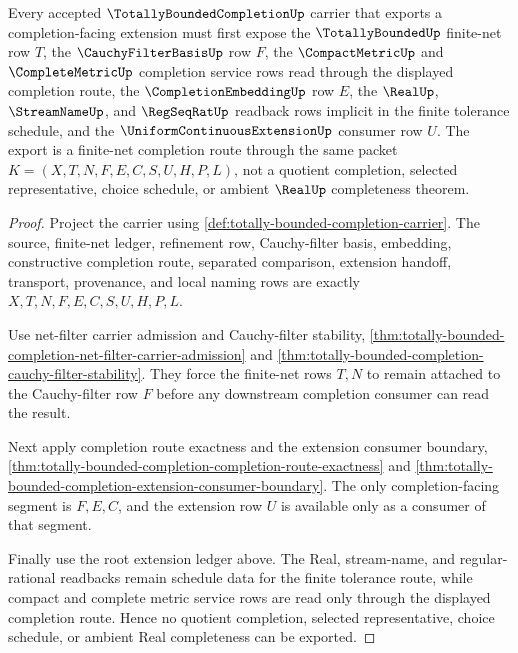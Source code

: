 \begin{theorem}
\label{thm:totally-bounded-completion-finite-net-completion-route}
Every accepted $\TotallyBoundedCompletionUp$ carrier that exports a completion-facing extension must first expose the $\TotallyBoundedUp$ finite-net row $T$, the $\CauchyFilterBasisUp$ row $F$, the $\CompactMetricUp$ and $\CompleteMetricUp$ completion service rows read through the displayed completion route, the $\CompletionEmbeddingUp$ row $E$, the $\RealUp$, $\StreamNameUp$, and $\RegSeqRatUp$ readback rows implicit in the finite tolerance schedule, and the $\UniformContinuousExtensionUp$ consumer row $U$. The export is a finite-net completion route through the same packet $K=(X,T,N,F,E,C,S,U,H,P,L)$, not a quotient completion, selected representative, choice schedule, or ambient $\RealUp$ completeness theorem.
\end{theorem}
\begin{proof}
Project the carrier using \autoref{def:totally-bounded-completion-carrier}. The source, finite-net ledger, refinement row, Cauchy-filter basis, embedding, constructive completion route, separated comparison, extension handoff, transport, provenance, and local naming rows are exactly $X,T,N,F,E,C,S,U,H,P,L$.

Use net-filter carrier admission and Cauchy-filter stability, \autoref{thm:totally-bounded-completion-net-filter-carrier-admission} and \autoref{thm:totally-bounded-completion-cauchy-filter-stability}. They force the finite-net rows $T,N$ to remain attached to the Cauchy-filter row $F$ before any downstream completion consumer can read the result.

Next apply completion route exactness and the extension consumer boundary, \autoref{thm:totally-bounded-completion-completion-route-exactness} and \autoref{thm:totally-bounded-completion-extension-consumer-boundary}. The only completion-facing segment is $F,E,C$, and the extension row $U$ is available only as a consumer of that segment.

Finally use the root extension ledger above. The Real, stream-name, and regular-rational readbacks remain schedule data for the finite tolerance route, while compact and complete metric service rows are read only through the displayed completion route. Hence no quotient completion, selected representative, choice schedule, or ambient Real completeness can be exported.
\end{proof}

